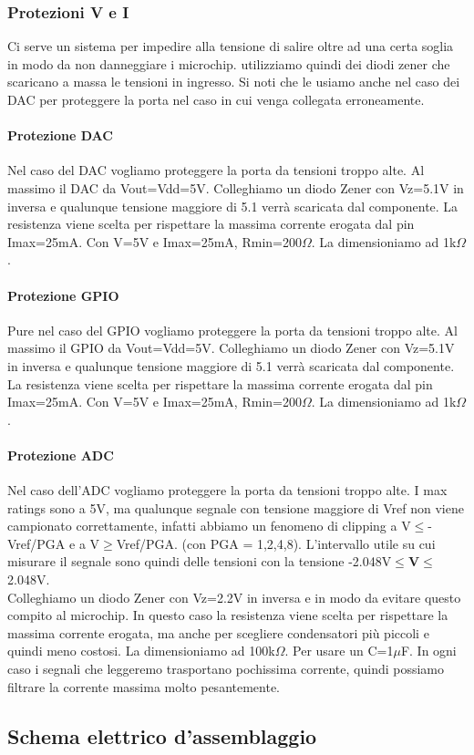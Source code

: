 \documentclass[10pt]{article}
\begin{document}
		\subsubsection{Protezioni V e I}
		Ci serve un sistema per impedire alla tensione di salire oltre ad una certa soglia in modo da non danneggiare i microchip. utilizziamo quindi dei diodi zener che scaricano a massa le tensioni in ingresso.
		Si noti che le usiamo anche nel caso dei DAC per proteggere la porta nel caso in cui venga collegata erroneamente.
			\paragraph{Protezione DAC}
				Nel caso del DAC vogliamo proteggere la porta da tensioni troppo alte. Al massimo il DAC da Vout=Vdd=5V. Colleghiamo un diodo Zener con Vz=5.1V in inversa e qualunque tensione maggiore di 5.1 verrà scaricata dal componente.
				La resistenza viene scelta per rispettare la massima corrente erogata dal pin Imax=25mA. Con V=5V e Imax=25mA, Rmin=200\(\Omega\). La dimensioniamo ad 1k\(\Omega\).
			\paragraph{Protezione GPIO}
				Pure nel caso del GPIO vogliamo proteggere la porta da tensioni troppo alte. Al massimo il GPIO da Vout=Vdd=5V. Colleghiamo un diodo Zener con Vz=5.1V in inversa e qualunque tensione maggiore di 5.1 verrà scaricata dal componente.
				La resistenza viene scelta per rispettare la massima corrente erogata dal pin Imax=25mA. Con V=5V e Imax=25mA, Rmin=200\(\Omega\). La dimensioniamo ad 1k\(\Omega\).
			\paragraph{Protezione ADC}
				Nel caso dell'ADC vogliamo proteggere la porta da tensioni troppo alte. I max ratings sono a 5V, ma qualunque segnale con tensione maggiore di Vref non viene campionato correttamente,
				infatti abbiamo un fenomeno di clipping a V\(\le\)-Vref/PGA e a V\(\ge\)Vref/PGA. (con PGA = 1,2,4,8).
				L'intervallo utile su cui misurare il segnale sono quindi delle tensioni con la tensione -2.048V\(\le\)\textbf{V}\(\le\)2.048V.\\
				Colleghiamo un diodo Zener con Vz=2.2V in inversa e in modo da evitare questo compito al microchip.
				In questo caso la resistenza viene scelta per rispettare la massima corrente erogata, ma anche per scegliere condensatori più piccoli e quindi meno costosi.
				La dimensioniamo ad 100k\(\Omega\). Per usare un C=1\(\mu\)F. In ogni caso i segnali che leggeremo trasportano pochissima corrente, quindi possiamo filtrare la corrente massima molto pesantemente.
	\subsection{Schema elettrico d'assemblaggio}
\end{document}
